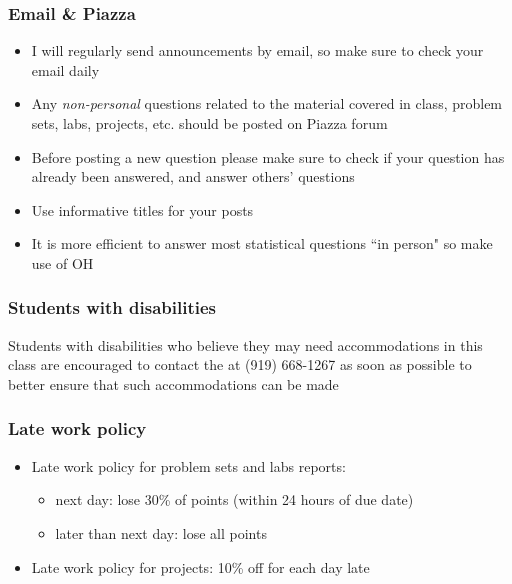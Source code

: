 \documentclass[11pt,containsverbatim,handout,xcolor=xelatex,dvipsnames,table]{beamer}
\begin{document}

\begin{frame}
\frametitle{Email \& Piazza}

\begin{itemize}

\item I will regularly send announcements by email, so make sure to check your email  daily

\item Any \emph{non-personal} questions related to the material covered in class, problem sets, labs, projects, etc. should be posted on Piazza forum

\item Before posting a new question please make sure to check if your question has already been answered, and answer others' questions

\item Use informative titles for your posts

\item It is more efficient to answer most statistical questions ``in person" so make use of OH

\end{itemize}

\end{frame}


\begin{frame}
\frametitle{Students with disabilities}

Students with disabilities who believe they may need accommodations in this class are encouraged to contact the  at (919) 668-1267 as soon as possible to better ensure that such accommodations can be made

\vfill


\end{frame}


\begin{frame}
\frametitle{Late work policy}

\begin{itemize}

\item Late work policy for problem sets and labs reports:
\begin{itemize}
\item next day: lose 30\% of points (within 24 hours of due date)
\item later than next day: lose all points
\end{itemize}

\item Late work policy for projects: 10\% off for each day late

\end{itemize}

\end{frame}
\end{document}
